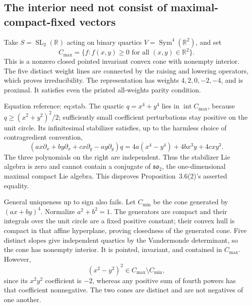 \documentclass[10pt]{article}
\begin{document}
\subsection*{The interior need not consist of maximal-compact-fixed vectors}
Take \(S=\operatorname{SL}_2(\mathbb R)\) acting on binary quartics \(V=\operatorname{Sym}^4(\mathbb R^2)\), and set \[C_{\max}=\{f:f(x,y)\geq0\text{ for all }(x,y)\in\mathbb R^2\}.\] This is a nonzero closed pointed invariant convex cone with nonempty interior. The five distinct weight lines are connected by the raising and lowering operators, which proves irreducibility. The representation has weights \(4,2,0,-2,-4\), and is proximal. It satisfies even the printed all-weights parity condition.\par
Equation reference: eq:stab. The quartic \(q=x^4+y^4\) lies in \(\operatorname{int}C_{\max}\), because \(q\geq(x^2+y^2)^2/2\); sufficiently small coefficient perturbations stay positive on the unit circle. Its infinitesimal stabilizer satisfies, up to the harmless choice of contragredient convention, \[
(a x\partial_x+b y\partial_x+c x\partial_y-a y\partial_y)q
=4a(x^4-y^4)+4b x^3y+4c xy^3 .\] The three polynomials on the right are independent. Thus the stabilizer Lie algebra is zero and cannot contain a conjugate of \(\mathfrak{so}_2\), the one-dimensional maximal compact Lie algebra. This disproves Proposition 3.6(2)’s asserted equality.\par
General uniqueness up to sign also fails. Let \(C_{\min}\) be the cone generated by \((a x+b y)^4\). Normalize \(a^2+b^2=1\). The generators are compact and their integrals over the unit circle are a fixed positive constant; their convex hull is compact in that affine hyperplane, proving closedness of the generated cone. Five distinct slopes give independent quartics by the Vandermonde determinant, so the cone has nonempty interior. It is pointed, invariant, and contained in \(C_{\max}\). However, \[(x^2-y^2)^2\in C_{\max}\setminus C_{\min},\] since its \(x^2y^2\) coefficient is \(-2\), whereas any positive sum of fourth powers has that coefficient nonnegative. The two cones are distinct and are not negatives of one another.\par
\end{document}
